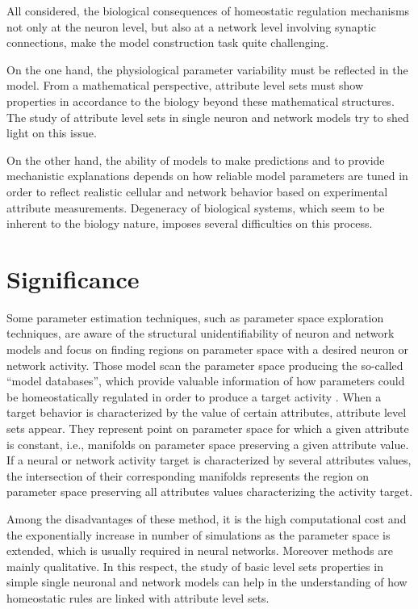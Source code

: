 All considered, the biological consequences of homeostatic regulation mechanisms not only at the neuron level, but also at a network level involving synaptic connections, make the model construction task quite challenging. 

On the one hand, the physiological parameter variability must be reflected in the model. From a mathematical perspective, attribute level sets must show properties in accordance to the biology beyond these mathematical structures. The study of attribute level sets in single neuron and network models try to shed light on this issue. 

On the other hand, the ability of models to make predictions and to provide mechanistic explanations depends on how reliable model parameters are tuned in order to reflect realistic cellular and network behavior based on experimental attribute measurements. Degeneracy of biological systems, which seem to be inherent to the biology nature, imposes several difficulties on this process. 


\section{Significance}
Some parameter estimation techniques, such as parameter space exploration techniques, are aware of the structural unidentifiability of neuron and network models and focus on finding regions on parameter space with a desired neuron or network activity. Those model scan the parameter space producing the so-called “model databases”, which provide valuable information of how parameters could be homeostatically regulated in order to produce a target activity \cite{Prinz2007}. When a target behavior is characterized by the value of certain attributes, attribute level sets appear. They represent point on parameter space for which a given attribute is constant, i.e., manifolds on parameter space preserving a given attribute value. If a neural or network activity target is characterized by several attributes values, the intersection of their corresponding manifolds represents the region on parameter space preserving all attributes values characterizing the activity target.

Among the disadvantages of these method, it is the high computational cost and the exponentially increase in number of simulations as the parameter space is extended, which is usually required in neural networks. Moreover methods are mainly qualitative. In this respect, the study of basic level sets properties in simple single neuronal and network models can help in the understanding of how homeostatic rules are linked with attribute level sets.

